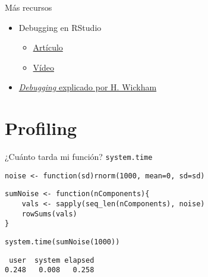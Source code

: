 \documentclass[xcolor={usenames,svgnames,dvipsnames}]{beamer}
\begin{document}
\begin{frame}[label={sec:org2cdcfbd}]{Más recursos}
\begin{itemize}
\item Debugging en RStudio
\begin{itemize}
\item \href{https://support.rstudio.com/hc/en-us/articles/205612627-Debugging-with-RStudio}{Artículo}
\item \href{https://vimeo.com/97831988}{Vídeo}
\end{itemize}
\item \href{http://adv-r.had.co.nz/Exceptions-Debugging.html}{\emph{Debugging} explicado por H. Wickham}
\end{itemize}
\end{frame}

\section{Profiling}
\label{sec:orgc88c0c5}
\begin{frame}[fragile,label={sec:org75d7c23}]{¿Cuánto tarda mi función? \texttt{system.time}}
 \lstset{language=r,label= ,caption= ,captionpos=b,numbers=none}
\begin{lstlisting}
noise <- function(sd)rnorm(1000, mean=0, sd=sd)
\end{lstlisting}

\lstset{language=r,label= ,caption= ,captionpos=b,numbers=none}
\begin{lstlisting}
sumNoise <- function(nComponents){
    vals <- sapply(seq_len(nComponents), noise)
    rowSums(vals)
}
\end{lstlisting}

\lstset{language=r,label= ,caption= ,captionpos=b,numbers=none}
\begin{lstlisting}
system.time(sumNoise(1000))
\end{lstlisting}

\begin{verbatim}
 user  system elapsed 
0.248   0.008   0.258
\end{verbatim}
\end{frame}
\end{document}
